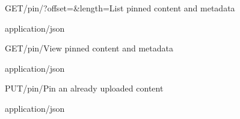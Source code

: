 
\begin{apiRoute}{GET}{/pin/?offset=\&length=}{List pinned content and metadata}
{
}
{ }

\begin{queryParameter} 
\end{queryParameter}
\begin{routeResponse}{application/json}
\end{routeResponse}
\end{apiRoute}


\begin{apiRoute}{GET}{/pin/}{View pinned content and metadata}
{
}
{ }

\begin{routeParameter} 
\end{routeParameter}
\begin{routeResponse}{application/json}
\end{routeResponse}
\end{apiRoute}




\begin{apiRoute}{PUT}{/pin/}{Pin an already uploaded content}
{
}
{ }

\begin{routeParameter} 
\end{routeParameter}
\begin{routeResponse}{application/json}
\end{routeResponse}
\end{apiRoute}





  
